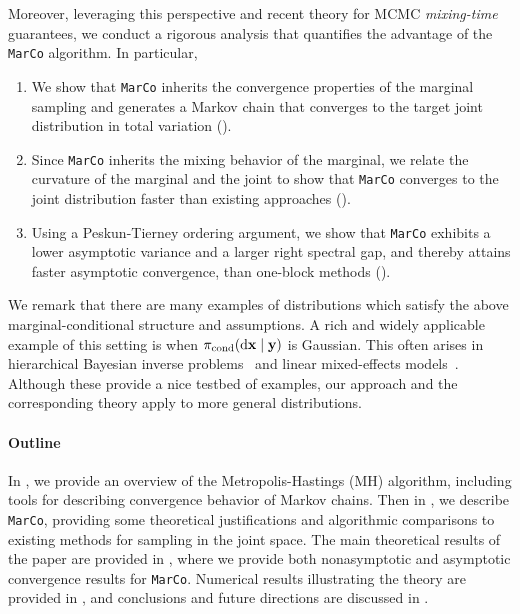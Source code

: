 \documentclass[onefignum,onetabnum]{siamonline250211}
\renewcommand{\d} {{\rm d}}                                %
\newcommand{\bfx}{{\bf x}}
\newcommand{\bfy}{{\bf y}}
\newcommand{\pcond}{\pi_{\rm cond}}
\newcommand{\MarCo}{\textnormal{\texttt{MarCo}}\xspace}
\begin{document}
%
Moreover, leveraging this perspective and recent theory for MCMC \emph{mixing-time} guarantees, we conduct a rigorous analysis that quantifies the advantage of the \MarCo algorithm.
In particular,
\begin{enumerate}
\item We show that \MarCo inherits the convergence properties of the marginal sampling and generates a Markov chain that converges to the target joint distribution in total variation ().
\item Since \MarCo inherits the mixing behavior of the marginal, we relate the curvature of the marginal and the joint to show that \MarCo converges to the joint distribution faster than existing approaches ().
\item Using a Peskun-Tierney ordering argument, we show that \MarCo exhibits a lower asymptotic variance and a larger right spectral gap, and thereby attains faster asymptotic convergence, than one-block methods ().
\end{enumerate}

We remark that there are many examples of distributions which satisfy the above marginal-conditional structure and assumptions.
A rich and widely applicable example of this setting is when $\pcond(\d \bfx \mid \bfy)$ is Gaussian.
This often arises in hierarchical Bayesian inverse problems~\cite{saibaba_efficient_2019} and linear mixed-effects models~\cite{domke_hamiltonian_2024}.
Although these provide a nice testbed of examples, our approach and the corresponding theory apply to more general distributions.

\paragraph{Outline} In , we provide an overview of the Metropolis-Hastings (MH) algorithm, including tools for describing convergence behavior of Markov chains.
Then in , we describe \MarCo, providing some theoretical justifications and algorithmic comparisons to existing methods for sampling in the joint space.
The main theoretical results of the paper are provided in , where we provide both nonasymptotic and asymptotic convergence results for \MarCo.
Numerical results illustrating the theory are provided in , and conclusions and future directions are discussed in .
 
\end{document}
